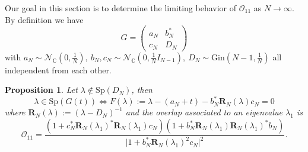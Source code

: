 \documentclass[12pt,a4paper]{amsart}
\theoremstyle{plain} %
\newtheorem{proposition}[theorem]{Proposition}
\newcommand{\C}{\mathbb{C}}
\newcommand{\Ov}{\mathscr{O}}
\newcommand{\la}{\lambda}
\begin{document}
Our goal in this section is to determine the limiting behavior of $\Ov_{11}$ as $N\rightarrow \infty$.
By definition we have 
\begin{equation*}
   G= \begin{pmatrix}
        a_N&b_N^*\\
        c_N&D_N
    \end{pmatrix}
\end{equation*}
with $a_N\sim \mathcal{N}_{\C}\left(0,\frac{1}{N}\right), \ b_N,c_N \sim \mathcal{N}_{\C}\left(0,\frac{1}{N}I_{N-1}\right), \ D_N \sim \mathrm{Gin}\left(N-1,\frac{1}{N}\right)$ all independent from each other. \\
\begin{proposition}
    Let $\lambda \notin \mathrm{Sp}(D_N)$, then 
    \begin{equation}\label{eigenvalue_cond}
        \lambda \in \mathrm{Sp}(G(t)) \iff F(\lambda):= \lambda - (a_N+t)- b_N^*\mathbf{R}_{N}(\la)c_N=0
    \end{equation}
    where $\mathbf{R}_N(\lambda):=(\lambda-D_N)^{-1}$
    and the overlap associated to an eigenvalue $\la_1$ is 
    \begin{equation*}
        \Ov_11= \frac{(1+c_N^*\mathbf{R}_{N}(\la_1)^*\mathbf{R}_{N}(\la_1)c_N)(1+b_N^*\mathbf{R}_{N}(\la_1)\mathbf{R}_{N}(\la_1)^*b_N)}{\lvert 1 +b_N^*\mathbf{R}_{N}(\la_1)^2c_N\lvert^2}.
    \end{equation*}
\end{proposition}
\end{document}
